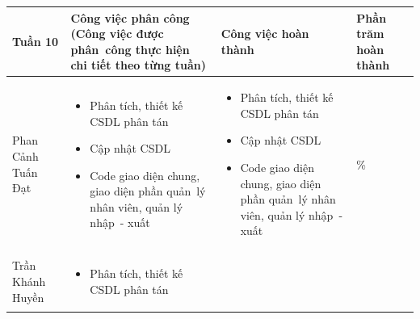 \documentclass[a4paper,12pt]{report}
\begin{document}
\noindent
\begin{center}
    \begin{longtable}{|>{\centering\arraybackslash}p{3cm}|
        >{\centering\arraybackslash}p{5.5cm}|
        >{\centering\arraybackslash}p{5.5cm}|
        >{\centering\arraybackslash}p{1.5cm}|}
        \hline
        \textbf{Tuần 10}                                                                                                               &
        \textbf{Công việc phân công \newline
            (Công việc được phân~công thực hiện chi tiết theo từng tuần)
        }                                                                                                                              &
        \textbf{Công việc hoàn thành}                                                                                                  &
        \textbf{Phần trăm hoàn thành}                                                                                                          \\
        \hline
        Phan Cảnh Tuấn Đạt                                                                                                             &
        \begin{itemize}
            \item Phân tích, thiết kế CSDL phân tán
            \item Cập nhật CSDL
            \item Code giao diện chung, giao diện phần quản~lý nhân viên, quản lý nhập~- xuất
        \end{itemize}                                              &
        \begin{itemize}
            \item Phân tích, thiết kế CSDL phân tán
            \item Cập nhật CSDL
            \item Code giao diện chung, giao diện phần quản~lý nhân viên, quản lý nhập~- xuất
        \end{itemize}
                                                                                                                                       & 100\% \\
        \hline
        Trần Khánh Huyền                                                                                                               &
        \begin{itemize}
            \item Phân tích, thiết kế CSDL phân tán

\end{itemize}
\end{longtable}
\end{center}
\end{document}
